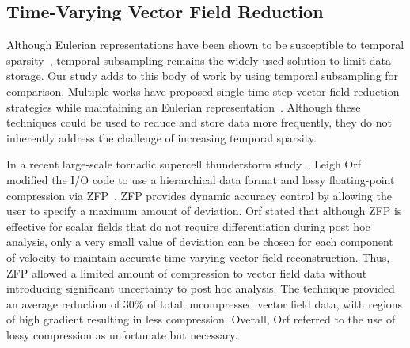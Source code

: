 \documentclass[runningheads]{llncs}
\begin{document}
\vspace{-1mm}
\subsection{Time-Varying Vector Field Reduction}
%
Although Eulerian representations have been shown to be susceptible to temporal sparsity~\cite{costa2004lagrangian}\cite{Qin2014}\cite{agranovsky2014improved}\cite{sane2018revisiting}, temporal subsampling remains the widely used solution to limit data storage.
%
Our study adds to this body of work by using temporal subsampling for comparison.
%
Multiple works have proposed single time step vector field reduction strategies while maintaining an Eulerian representation~\cite{lodha2003topology}\cite{theisel2003combining}\cite{tong2012salient}.
%
Although these techniques could be used to reduce and store data more frequently, they do not inherently address the challenge of increasing temporal sparsity.
%

In a recent large-scale tornadic supercell thunderstorm study~\cite{atmos10100578}, Leigh Orf modified the I/O code to use a hierarchical data format and lossy floating-point compression via ZFP~\cite{lindstrom2006fast}.
%
ZFP provides dynamic accuracy control by allowing the user to specify a maximum amount of deviation.
%
Orf stated that although ZFP is effective for scalar fields that do not require differentiation during post hoc analysis, only a very small value of deviation can be chosen for each component of velocity to maintain accurate time-varying vector field reconstruction.
%
Thus, ZFP allowed a limited amount of compression to vector field data without introducing significant uncertainty to post hoc analysis.
%
The technique provided an average reduction of 30\% of total uncompressed vector field data, with regions of high gradient resulting in less compression.
%
Overall, Orf referred to the use of lossy compression as unfortunate but necessary.

\vspace{-2mm}
\end{document}
